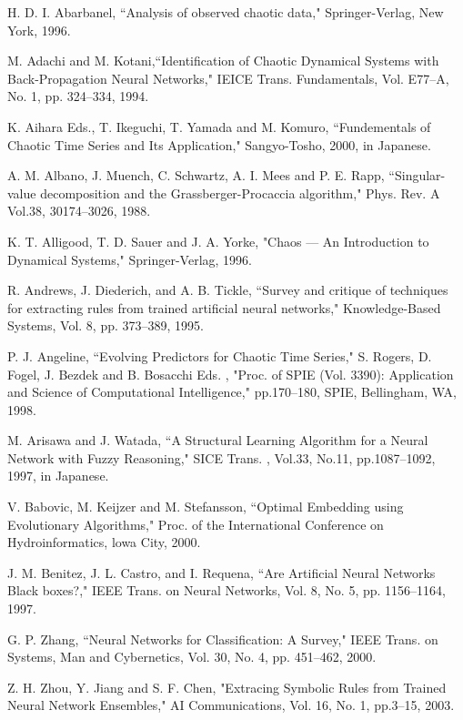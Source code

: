 ﻿%


\begin{thebibliography}{99}

H. D. I. Abarbanel, ``Analysis of observed chaotic data," Springer-Verlag, New York, 1996.

M. Adachi and M. Kotani,``Identification of Chaotic Dynamical Systems with Back-Propagation Neural Networks," IEICE Trans. Fundamentals, Vol. E77--A, No. 1, pp. 324--334, 1994.

K. Aihara Eds., T. Ikeguchi, T. Yamada and M. Komuro, ``Fundementals of Chaotic Time Series and Its Application," Sangyo-Tosho, 2000, in Japanese.

 A. M. Albano, J. Muench, C. Schwartz, A. I. Mees and  P. E. Rapp, ``Singular-value decomposition and the Grassberger-Procaccia algorithm," Phys. Rev. A Vol.38, 30174--3026, 1988.

K. T. Alligood, T. D. Sauer and J. A. Yorke, "Chaos --- An Introduction to Dynamical Systems," Springer-Verlag, 1996.

R. Andrews, J. Diederich, and A. B. Tickle, ``Survey and critique of techniques for extracting rules from trained artificial neural networks," Knowledge-Based Systems, Vol. 8, pp. 373--389, 1995.

P. J. Angeline, ``Evolving Predictors for Chaotic Time Series," S. Rogers, D. Fogel, J. Bezdek and B. Bosacchi Eds. , "Proc. of SPIE (Vol. 3390): Application and Science of Computational Intelligence," pp.170--180, SPIE, Bellingham, WA, 1998. 

M. Arisawa and J. Watada, ``A Structural Learning Algorithm for a Neural Network with Fuzzy Reasoning," SICE Trans. , Vol.33, No.11, pp.1087--1092, 1997, in Japanese.

V. Babovic, M. Keijzer and M. Stefansson, ``Optimal Embedding using Evolutionary Algorithms," Proc. of the International Conference on Hydroinformatics, lowa City, 2000.

J. M. Benitez, J. L. Castro, and I. Requena, ``Are Artificial Neural Networks Black boxes?," IEEE Trans. on Neural Networks, Vol. 8, No. 5, pp. 1156--1164, 1997.

G. P. Zhang, ``Neural Networks for Classification: A Survey," IEEE Trans. on Systems, Man and Cybernetics, Vol. 30, No. 4, pp. 451--462, 2000.

Z. H. Zhou, Y. Jiang and S. F. Chen, "Extracing Symbolic Rules from Trained Neural Network Ensembles," AI Communications, Vol. 16, No. 1, pp.3--15, 2003. 


\end{thebibliography}


